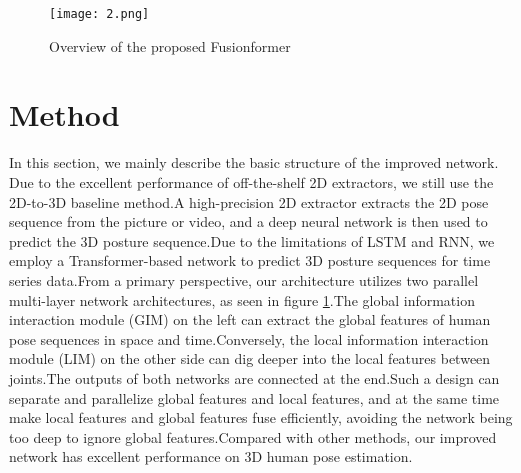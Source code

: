 \documentclass{article}
\begin{document}
\begin{figure}
\centering
\texttt{[image: 2.png]}
\caption{Overview of the proposed Fusionformer}
\label{fig3}
\end{figure}



\section{Method}
In this section, we mainly describe the basic structure of the improved network. Due to the excellent performance of off-the-shelf 2D extractors, we still use the 2D-to-3D baseline method.A high-precision 2D extractor extracts the 2D pose sequence from the picture or video, and a deep neural network is then used to predict the 3D posture sequence.Due to the limitations of LSTM and RNN, we employ a Transformer-based network to predict 3D posture sequences for time series data.From a primary perspective, our architecture utilizes two parallel multi-layer network architectures, as seen in figure \ref{fig3}.The global information interaction module (GIM) on the left can extract the global features of human pose sequences in space and time.Conversely, the local information interaction module (LIM) on the other side can dig deeper into the local features between joints.The outputs of both networks are connected at the end.Such a design can separate and parallelize global features and local features, and at the same time make local features and global features fuse efficiently, avoiding the network being too deep to ignore global features.Compared with other methods, our improved network has excellent performance on 3D human pose estimation.
\end{document}
